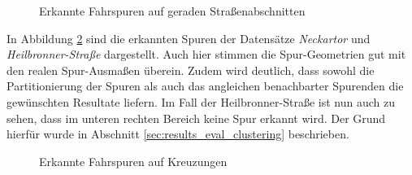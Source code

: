 \begin{figure}[H]
    \centering
    \caption{Erkannte Fahrspuren auf geraden Straßenabschnitten}
    \label{fig:results_lanes1}
\end{figure}

In Abbildung \ref{fig:results_lanes2} sind die erkannten Spuren der Datensätze \textit{Neckartor} und \textit{Heilbronner-Straße}
dargestellt. Auch hier stimmen die Spur-Geometrien gut mit den realen Spur-Ausmaßen überein. Zudem wird deutlich,
dass sowohl die Partitionierung der Spuren als auch das angleichen benachbarter Spurenden die gewünschten Resultate liefern.
Im Fall der Heilbronner-Straße ist nun auch zu sehen, dass im unteren rechten Bereich keine Spur erkannt wird.
Der Grund hierfür wurde in Abschnitt \ref{sec:results_eval_clustering} beschrieben.

\begin{figure}[H]
    \centering
    \caption{Erkannte Fahrspuren auf Kreuzungen}
    \label{fig:results_lanes2}
\end{figure}

